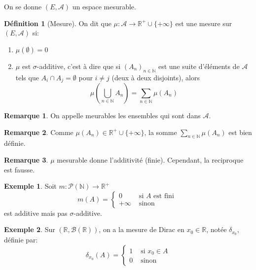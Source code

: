 \documentclass{article}
\theoremstyle{definition}
\newtheorem{definition}{Définition}
\theoremstyle{definition}
\theoremstyle{definition}
\theoremstyle{definition}
\newtheorem{example}{Exemple}
\theoremstyle{plain}
\theoremstyle{definition}
\newtheorem{remarque}{Remarque}
\begin{document}
On se donne $(E, \mathscr{A})$ un espace mesurable.

\begin{definition}[Mesure]
	On dit que $\mu : \mathscr{A} \to \mathbb{R}^+\cup \{+\infty\}$ est une mesure sur $(E, \mathscr{A})$ si:
	\begin{enumerate}
		\item $\mu(\emptyset) = 0$
		\item $\mu$ est $\sigma$-additive, c'est à dire que si $(A_n)_{n \in \mathbb{N}}$ est une suite d'éléments de $\mathscr{A}$
		      tels que $A_i \cap A_j = \emptyset$ pour $i \neq j$ (deux à deux disjoints), alors
		      \begin{equation*}
			      \mu\left(\bigcup\limits_{n \in \mathbb{N}} A_n\right) = \sum\limits_{n \in \mathbb{N}} \mu(A_n)
		      \end{equation*}
	\end{enumerate}
\end{definition}

\begin{remarque}
	On appelle meurables les ensembles qui sont dans $\mathscr{A}$.
\end{remarque}

\begin{remarque}
	Comme $\mu (A_n) \in \mathbb{R}^+ \cup \{+\infty\}$, la somme $\sum\limits_{n \in \mathbb{N}} \mu(A_n)$ est bien définie.
\end{remarque}

\begin{remarque}
	$\mu$ mesurable donne l'additivité (finie). Cependant, la reciproque est fausse.
	\begin{example}
		Soit $m: \mathscr{P}(\mathbb{N}) \to \mathbb{R}^+$
		\begin{equation*}
			m(A) = \left\{
			\begin{array}{ll}
				0       & \text{ si } A \text{ est fini } \\
				+\infty & \text{ sinon }
			\end{array}
			\right.
		\end{equation*}
		est additive mais pas $\sigma$-additive.
	\end{example}
\end{remarque}

\begin{example}
	Sur $(\mathbb{R}, \mathscr{B}(\mathbb{R}))$, on a la mesure de
	Dirac en $x_0 \in \mathbb{R}$, notée $\delta_{x_0}$, définie par:
	\begin{equation*}
		\delta_{x_0}(A) = \left\{
		\begin{array}{ll}
			1 & \text{ si } x_0 \in A \\
			0 & \text{ sinon }
		\end{array}
		\right.
	\end{equation*}
\end{example}
\end{document}
